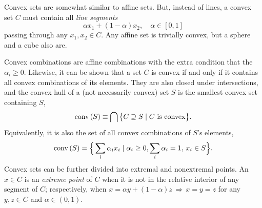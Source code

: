 		Convex sets are somewhat similar to affine sets. But, instead of lines, a convex set $C$ must contain all \emph{line segments}
		$$
			\alpha x_1 + (1 - \alpha) x_2, \quad\alpha \in [0,1]
		$$
		passing through any $x_1, x_2 \in C$. Any affine set is trivially convex, but a sphere and a cube also are.

		Convex combinations are affine combinations with the extra condition that the $\alpha_i \geq 0$. Likewise, it can be shown that a set $C$ is convex if and only if it contains all convex combinations of its elements. They are also closed under intersections, and the convex hull of a (not necessarily convex) set $S$ is the smallest convex set containing $S$,
		$$
			\text{conv} \left( S \right) \equiv \bigcap \big\{ C \supseteq S \mid C \text{ is convex} \big\} .
		$$
		Equivalently, it is also the set of all convex combinations of $S$'s elements,
		$$
			\text{conv} \left( S \right) = \Big\{ \sum_i \alpha_i x_i \mid \alpha_i \geq 0, \sum_i \alpha_i = 1, \, x_i \in S \Big\} .
		$$
		Convex sets can be further divided into extremal and nonextremal points. An $x \in C$ is an \emph{extreme point} of $C$ when it is not in the relative interior of any segment of $C$; respectively, when $x = \alpha y + (1 - \alpha) z \,\Rightarrow\, x=y=z$ for any $y, z \in C$ and $\alpha \in (0, 1)$.

